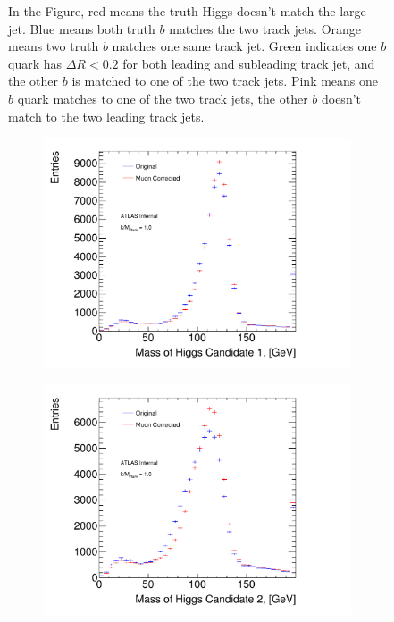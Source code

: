 \begin{figure}[htbp!]
{In the Figure, red means the truth Higgs doesn't match the large-\R jet. Blue means both truth $b$ matches the two track jets. Orange means two truth $b$ matches one same track jet. Green indicates one $b$ quark has $\Delta R<0.2$ for both leading and subleading track jet, and the other $b$ is matched to one of the two track jets. Pink means one $b$ quark matches to one of the two track jets, the other $b$ doesn't match to the two leading track jets.}
\label{fig:truth-bmatch}
\end{figure}


\begin{figure}
\begin{center}
    \captionsetup{justification=centering}
    \begin{subfigure}[b]{0.45\textwidth}
        \includegraphics[width=\textwidth]{figures/boosted/muons/h1_mass_dbl.pdf}
        \caption{\mleadJ}
        \label{fig:boosted-muons-signal-leadj}
    \end{subfigure}
    \quad
    \begin{subfigure}[b]{0.45\textwidth}
        \includegraphics[width=\textwidth]{figures/boosted/muons/h2_mass_dbl.pdf}

\end{subfigure}
\end{center}
\end{figure}

